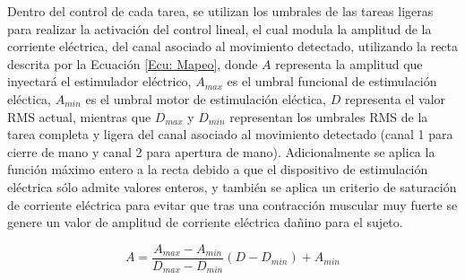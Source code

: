 Dentro del control de cada tarea, se utilizan los umbrales de las tareas ligeras para realizar la activación del control lineal, el cual modula la amplitud de la corriente eléctrica, del canal asociado al movimiento detectado, utilizando la recta descrita por la Ecuación \ref{Ecu: Mapeo}, donde $A$ representa la amplitud que inyectará el estimulador eléctrico, $A_{max}$ es el umbral funcional de estimulación eléctica, $A_{min}$ es el umbral motor de estimulación eléctica, $D$ representa el valor RMS actual, mientras que $D_{max}$ y $D_{min}$ representan los umbrales RMS de la tarea completa y ligera del canal asociado al movimiento detectado (canal 1 para cierre de mano y canal 2 para apertura de mano). Adicionalmente se aplica la función máximo entero a la recta debido a que el dispositivo de estimulación eléctrica sólo admite valores enteros, y también se aplica un criterio de saturación de corriente eléctrica para evitar que tras una contracción muscular muy fuerte se genere un valor de amplitud de corriente eléctrica dañino para el sujeto.

\begin{equation}
	A = \frac{A_{max} - A_{min}}{D_{max} - D_{min}}(D - D_{min}) + A_{min}
	\label{Ecu: Mapeo}
\end{equation}

